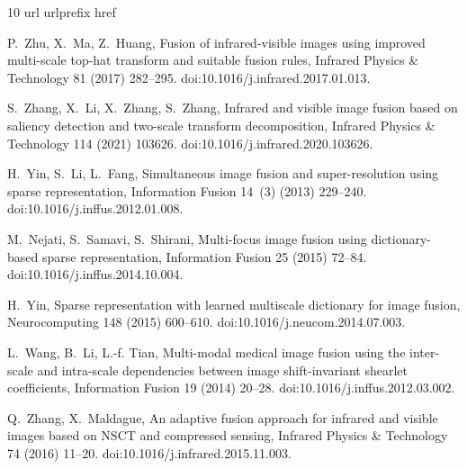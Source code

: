 \begin{thebibliography}{10}
\expandafter\ifx\csname url\endcsname\relax
  \def\url#1{\texttt{#1}}\fi
\expandafter\ifx\csname urlprefix\endcsname\relax\def\urlprefix{URL }\fi
\expandafter\ifx\csname href\endcsname\relax
  \def\href#1#2{#2} \def\path#1{#1}\fi

P.~Zhu, X.~Ma, Z.~Huang, {Fusion of infrared-visible images using improved
  multi-scale top-hat transform and suitable fusion rules}, Infrared Physics \&
  Technology 81 (2017) 282--295.
\newblock \href {https://doi.org/10.1016/j.infrared.2017.01.013}
  {\path{doi:10.1016/j.infrared.2017.01.013}}.

S.~Zhang, X.~Li, X.~Zhang, S.~Zhang, {Infrared and visible image fusion based
  on saliency detection and two-scale transform decomposition}, Infrared
  Physics \& Technology 114 (2021) 103626.
\newblock \href {https://doi.org/10.1016/j.infrared.2020.103626}
  {\path{doi:10.1016/j.infrared.2020.103626}}.

H.~Yin, S.~Li, L.~Fang, {Simultaneous image fusion and super-resolution using
  sparse representation}, Information Fusion 14~(3) (2013) 229--240.
\newblock \href {https://doi.org/10.1016/j.inffus.2012.01.008}
  {\path{doi:10.1016/j.inffus.2012.01.008}}.

M.~Nejati, S.~Samavi, S.~Shirani, {Multi-focus image fusion using
  dictionary-based sparse representation}, Information Fusion 25 (2015) 72--84.
\newblock \href {https://doi.org/10.1016/j.inffus.2014.10.004}
  {\path{doi:10.1016/j.inffus.2014.10.004}}.

H.~Yin, {Sparse representation with learned multiscale dictionary for image
  fusion}, Neurocomputing 148 (2015) 600--610.
\newblock \href {https://doi.org/10.1016/j.neucom.2014.07.003}
  {\path{doi:10.1016/j.neucom.2014.07.003}}.

L.~Wang, B.~Li, L.-f. Tian, {Multi-modal medical image fusion using the
  inter-scale and intra-scale dependencies between image shift-invariant
  shearlet coefficients}, Information Fusion 19 (2014) 20--28.
\newblock \href {https://doi.org/10.1016/j.inffus.2012.03.002}
  {\path{doi:10.1016/j.inffus.2012.03.002}}.

Q.~Zhang, X.~Maldague, {An adaptive fusion approach for infrared and visible
  images based on NSCT and compressed sensing}, Infrared Physics \& Technology
  74 (2016) 11--20.
\newblock \href {https://doi.org/10.1016/j.infrared.2015.11.003}
  {\path{doi:10.1016/j.infrared.2015.11.003}}.


\end{thebibliography}
